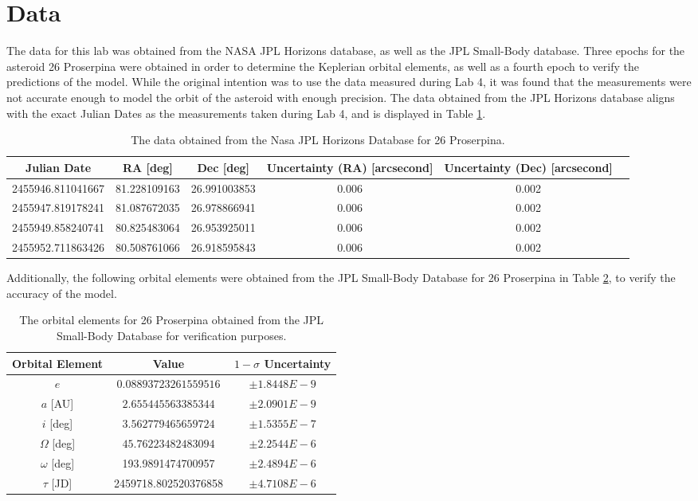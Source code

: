 \documentclass{article}
\begin{document}
\section{Data}
The data for this lab was obtained from the NASA JPL Horizons database, as well as the JPL Small-Body database. Three epochs 
for the asteroid 26 Proserpina were obtained in order to determine the Keplerian orbital elements, as well as a fourth epoch to verify 
the predictions of the model. While the original intention was to use the data measured during Lab 4, it was found that the measurements were not 
accurate enough to model the orbit of the asteroid with enough precision. The data obtained from the JPL Horizons database aligns with the exact Julian Dates as 
the measurements taken during Lab 4, and is displayed in Table \ref{tab:data}.
\begin{table}[H]
\centering
\begin{tabular}{|c|c|c|c|c|c|}
    \hline 
    \textbf{Julian Date} & \textbf{RA [deg]} & \textbf{Dec [deg]} & \textbf{Uncertainty (RA) [arcsecond]} & \textbf{Uncertainty (Dec) [arcsecond]} \\
    \hline
    2455946.811041667 & 81.228109163 & 26.991003853 & 0.006 & 0.002 \\
    \hline
    2455947.819178241 & 81.087672035 & 26.978866941 & 0.006 & 0.002 \\
    \hline
    2455949.858240741 & 80.825483064 & 26.953925011 & 0.006 & 0.002 \\
    \hline
    2455952.711863426 & 80.508761066 & 26.918595843 & 0.006 & 0.002 \\
    \hline
\end{tabular}
    \caption{The data obtained from the Nasa JPL Horizons Database for 26 Proserpina.}
    \label{tab:data}
\end{table}
Additionally, the following orbital elements were obtained from the JPL Small-Body Database for 26 Proserpina in Table \ref{tab:elements_nasa}, to verify 
the accuracy of the model. 

\begin{table}[H]
\centering
\begin{tabular}{|c|c|c|}
    \hline 
    \textbf{Orbital Element} & \textbf{Value} & \textbf{$1-\sigma$ Uncertainty}\\
    \hline
    $e$ & $0.08893723261559516$ & $\pm 1.8448E-9$ \\
    \hline
    $a$ [AU] & $2.655445563385344$ & $\pm 2.0901E-9$\\
    \hline
    $i$ [deg] & $3.562779465659724$ & $\pm 1.5355E-7$ \\
    \hline
    $\Omega$ [deg] & $45.76223482483094$ & $\pm 2.2544E-6$ \\
    \hline
    $\omega$ [deg] & 193.9891474700957 & $\pm 2.4894E-6$\\
    \hline
    $\tau$ [JD] & 2459718.802520376858 & $\pm 4.7108E-6$ \\
    \hline   
\end{tabular}
    \caption{The orbital elements for 26 Proserpina obtained from the JPL Small-Body Database for verification purposes.}
    \label{tab:elements_nasa}
\end{table}
\end{document}
